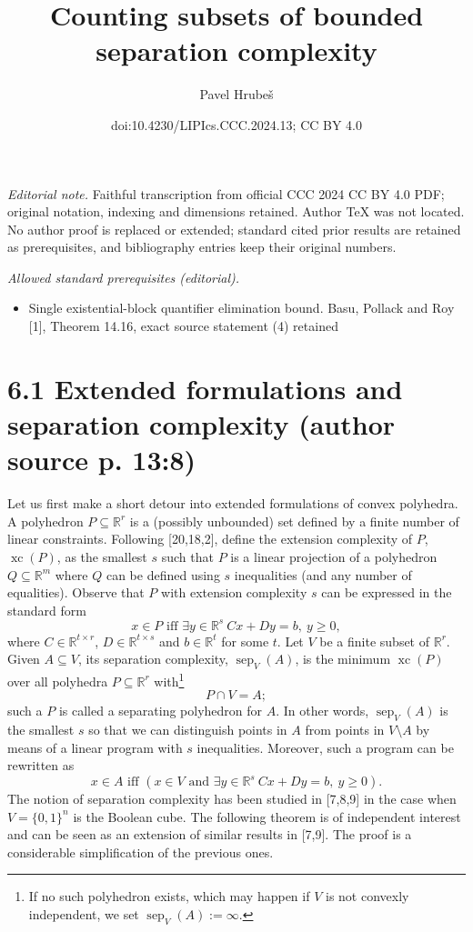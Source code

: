 \documentclass[10pt,a4paper]{article}
\title{Counting subsets of bounded separation complexity}
\author{Pavel Hrubeš}
\date{doi:10.4230/LIPIcs.CCC.2024.13; CC BY 4.0}
\newcommand{\xc}{\operatorname{xc}}
\newcommand{\sep}{\operatorname{sep}}
\newcommand{\RR}{\mathbb R}
\begin{document}
\maketitle
\noindent\textit{Editorial note.} Faithful transcription from official CCC 2024 CC BY 4.0 PDF; original notation, indexing and dimensions retained. Author TeX was not located. No author proof is replaced or extended; standard cited prior results are retained as prerequisites, and bibliography entries keep their original numbers.\par\medskip
\noindent\textit{Allowed standard prerequisites (editorial).}\begin{itemize}
\item Single existential-block quantifier elimination bound. Basu, Pollack and Roy [1], Theorem 14.16, exact source statement (4) retained
\end{itemize}\medskip
\section*{6.1 Extended formulations and separation complexity (author source p. 13:8)}
Let us first make a short detour into extended formulations of convex polyhedra.
A polyhedron $P\subseteq\RR^r$ is a (possibly unbounded) set defined by a finite number of linear constraints. Following [20,18,2], define the extension complexity of $P$, $\xc(P)$, as the smallest $s$ such that $P$ is a linear projection of a polyhedron $Q\subseteq\RR^m$ where $Q$ can be defined using $s$ inequalities (and any number of equalities). Observe that $P$ with extension complexity $s$ can be expressed in the standard form
\[x\in P\text{ iff }\exists y\in\RR^s\ Cx+Dy=b,\ y\ge0,\]
where $C\in\RR^{t\times r}$, $D\in\RR^{t\times s}$ and $b\in\RR^t$ for some $t$.
Let $V$ be a finite subset of $\RR^r$. Given $A\subseteq V$, its separation complexity, $\sep_V(A)$, is the minimum $\xc(P)$ over all polyhedra $P\subseteq\RR^r$ with\footnote{If no such polyhedron exists, which may happen if $V$ is not convexly independent, we set $\sep_V(A):=\infty$.}
\[P\cap V=A;\]
such a $P$ is called a separating polyhedron for $A$. In other words, $\sep_V(A)$ is the smallest $s$ so that we can distinguish points in $A$ from points in $V\setminus A$ by means of a linear program with $s$ inequalities. Moreover, such a program can be rewritten as
\[x\in A\text{ iff }(x\in V\text{ and }\exists y\in\RR^s\ Cx+Dy=b,\ y\ge0).\]
The notion of separation complexity has been studied in [7,8,9] in the case when $V=\{0,1\}^n$ is the Boolean cube. The following theorem is of independent interest and can be seen as an extension of similar results in [7,9]. The proof is a considerable simplification of the previous ones.
\end{document}
